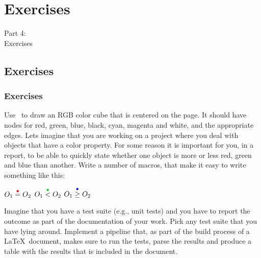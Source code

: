 {
\renewcommand{\bgcolor}{exercises}

\section{Exercises}
\begin{frame}
  \vspace{25mm}
  \begin{center}
    \Huge{Part 4:\\Exercises}
  \end{center}
\end{frame}

\subsection{Exercises}
\begin{frame}[fragile]
  \frametitle{Exercises}
  \vspace{1mm}
  \begin{enumerate}
     Use \TikZ\ to draw an RGB color cube that is centered on the page. It should have nodes for red, green, blue, black, cyan, magenta and white, and the appropriate edges.
     Lets imagine that you are working on a project where you deal with objects that have a color property. For some reason it is important for you, in a report, to be able to quickly state whether one object is more or less red, green and blue than another. Write a number of macros, that make it easy to write something like this:
      \begin{center}
        $O_1 \overset{\textcolor{red}{\bullet}}{=} O_2$
        \hspace{2cm}
        $O_1 \overset{\textcolor{green!80!black}{\bullet}}{<} O_2$
        \hspace{2cm}
        $O_1 \overset{\textcolor{blue}{\bullet}}{\geq} O_2$
      \end{center}
     Imagine that you have a test suite (e.g., unit tests) and you have to report the outcome as part of the documentation of your work. Pick any test suite that you have lying around. Implement a pipeline that, as part of the build process of a \LaTeX\ document, makes sure to run the tests, parse the results and produce a table with the results that is included in the document.
  \end{enumerate}
\end{frame}

}

